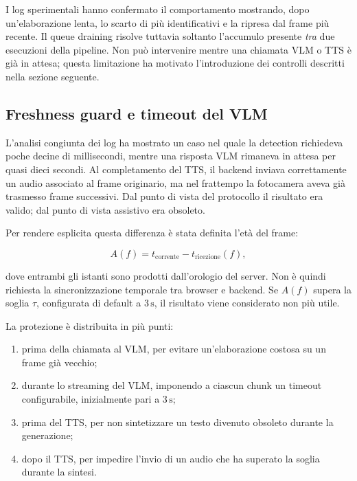 I log sperimentali hanno confermato il comportamento mostrando, dopo
un'elaborazione lenta, lo scarto di più identificativi e la ripresa dal frame
più recente. Il queue draining risolve tuttavia soltanto l'accumulo presente
\emph{tra} due esecuzioni della pipeline. Non può intervenire mentre una
chiamata VLM o TTS è già in attesa; questa limitazione ha motivato
l'introduzione dei controlli descritti nella sezione seguente.

\subsection{Freshness guard e timeout del VLM}
\label{subsec:problemi-freshness}

L'analisi congiunta dei log ha mostrato un caso nel quale la detection
richiedeva poche decine di millisecondi, mentre una risposta VLM rimaneva in
attesa per quasi dieci secondi. Al completamento del TTS, il backend inviava
correttamente un audio associato al frame originario, ma nel frattempo la
fotocamera aveva già trasmesso frame successivi. Dal punto di vista del
protocollo il risultato era valido; dal punto di vista assistivo era obsoleto.

Per rendere esplicita questa differenza è stata definita l'età del frame:

\begin{equation}
    A(f) = t_{\mathrm{corrente}} - t_{\mathrm{ricezione}}(f),
    \label{eq:frame-age}
\end{equation}

dove entrambi gli istanti sono prodotti dall'orologio del server. Non è
quindi richiesta la sincronizzazione temporale tra browser e backend. Se
\(A(f)\) supera la soglia \(\tau\), configurata di default a
\(3\,\mathrm{s}\), il risultato viene considerato non più utile.

La protezione è distribuita in più punti:

\begin{enumerate}
    \item prima della chiamata al VLM, per evitare un'elaborazione costosa su
    un frame già vecchio;
    \item durante lo streaming del VLM, imponendo a ciascun chunk un timeout
    configurabile, inizialmente pari a \(3\,\mathrm{s}\);
    \item prima del TTS, per non sintetizzare un testo divenuto obsoleto
    durante la generazione;
    \item dopo il TTS, per impedire l'invio di un audio che ha superato la
    soglia durante la sintesi.
\end{enumerate}

